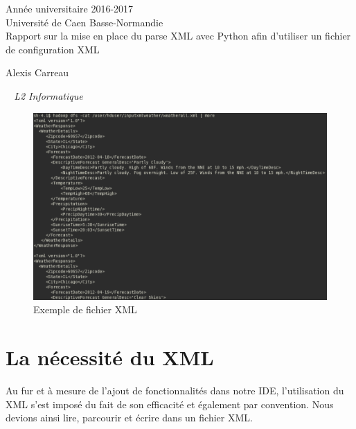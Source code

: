 \documentclass[a4paper,12pt]{article}
\begin{document}
\begin{titlepage}
	\begin{center}
		\Large{Année universitaire 2016-2017}\\
		\Large{Université de Caen Basse-Normandie}\\[1cm]
		
		\huge{Rapport sur la mise en place du parse XML avec Python afin d'utiliser un fichier de configuration XML}\\
		\vspace{3cm}
		
		Alexis Carreau
		
	\normalsize{\textit{ ~ L2 Informatique}}\\
		\medskip
		\vspace{2cm}
		
	\begin{figure}[h!]
			\begin{center}
				\includegraphics[scale=0.7]{images/intro.png}
				\caption{Exemple de fichier XML}
			\end{center}
		\end{figure}
				
	\end{center}
\end{titlepage}

\tableofcontents
\newpage

\section{La nécessité du XML}

Au fur et à mesure de l'ajout de fonctionnalités dans notre IDE, l'utilisation du XML s'est imposé du fait de son efficacité et également par convention. Nous devions ainsi lire, parcourir et écrire dans un fichier XML.
	
\end{document}
